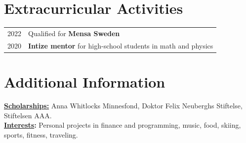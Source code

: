 \documentclass[a4paper,11pt]{article}
\begin{document}
\section{Extracurricular Activities}
\begin{tabularx}{\linewidth}{ @{}l X@{}}
2022 & Qualified for \textbf{Mensa Sweden} \\[3pt]
2020 & \textbf{Intize mentor} for high-school students in math and physics \\[3pt]
\end{tabularx}
\section{Additional Information}
\textbf{\underline{Scholarships:}} Anna Whitlocks Minnesfond, Doktor Felix Neuberghs Stiftelse, Stiftelsen AAA. \\[3pt]
\textbf{\underline{Interests}:} Personal projects in finance and programming, music, food, skiing, sports, fitness, traveling.
\end{document}
